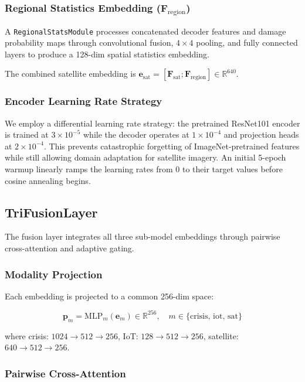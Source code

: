 \documentclass[journal]{IEEEtran}
\begin{document}
\subsubsection{Regional Statistics Embedding ($\mathbf{F}_\text{region}$)}

A \texttt{RegionalStatsModule} processes concatenated decoder features and damage probability maps through convolutional fusion, $4 \times 4$ pooling, and fully connected layers to produce a 128-dim spatial statistics embedding.

The combined satellite embedding is $\mathbf{e}_\text{sat} = [\mathbf{F}_\text{sat}; \mathbf{F}_\text{region}] \in \mathbb{R}^{640}$.

\subsubsection{Encoder Learning Rate Strategy}

We employ a differential learning rate strategy: the pretrained ResNet101 encoder is trained at $3 \times 10^{-5}$ while the decoder operates at $1 \times 10^{-4}$ and projection heads at $2 \times 10^{-4}$. This prevents catastrophic forgetting of ImageNet-pretrained features while still allowing domain adaptation for satellite imagery. An initial 5-epoch warmup linearly ramps the learning rates from 0 to their target values before cosine annealing begins.

\subsection{TriFusionLayer}

The fusion layer integrates all three sub-model embeddings through pairwise cross-attention and adaptive gating.

\subsubsection{Modality Projection}

Each embedding is projected to a common 256-dim space:

\begin{equation}
\mathbf{p}_m = \text{MLP}_m(\mathbf{e}_m) \in \mathbb{R}^{256}, \quad m \in \{\text{crisis, iot, sat}\}
\end{equation}

where crisis: $1024 \to 512 \to 256$, IoT: $128 \to 512 \to 256$, satellite: $640 \to 512 \to 256$.

\subsubsection{Pairwise Cross-Attention}
\end{document}
